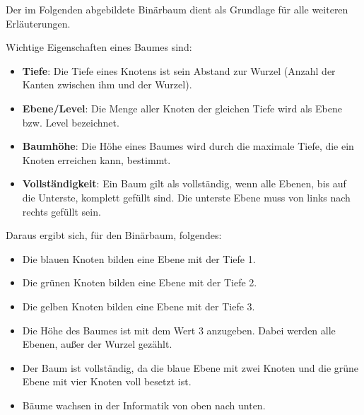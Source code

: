           Der im Folgenden abgebildete Bin\"arbaum dient als Grundlage f\"ur alle weiteren Erl\"auterungen.
          \begin{center}
          \end{center}
          Wichtige Eigenschaften eines Baumes sind:
          \begin{itemize}
            \item \textbf{Tiefe}: Die Tiefe eines Knotens ist sein Abstand zur Wurzel (Anzahl der Kanten zwischen ihm und der Wurzel).
            \item \textbf{Ebene/Level}: Die Menge aller Knoten der gleichen Tiefe wird als Ebene bzw. Level bezeichnet.
            \item \textbf{Baumh\"ohe}: Die H\"ohe eines Baumes wird durch die maximale Tiefe, die ein Knoten erreichen kann, bestimmt.
            \item \textbf{Vollst\"andigkeit}: Ein Baum gilt als vollst\"andig, wenn alle Ebenen, bis auf die Unterste, komplett gef\"ullt sind. Die unterste Ebene muss von links nach rechts gef\"ullt sein.
          \end{itemize}
          Daraus ergibt sich, f\"ur den Bin\"arbaum, folgendes:
          \begin{itemize}
            \item Die blauen Knoten bilden eine Ebene mit der Tiefe 1.
            \item Die gr\"unen Knoten bilden eine Ebene mit der Tiefe 2.
            \item Die gelben Knoten bilden eine Ebene mit der Tiefe 3.
            \item Die H\"ohe des Baumes ist mit dem Wert 3 anzugeben. Dabei werden alle Ebenen, au\ss{}er der Wurzel gez\"ahlt.
            \item Der Baum ist vollst\"andig, da die blaue Ebene mit zwei Knoten und die gr\"une Ebene mit vier Knoten voll besetzt ist.
            \item B\"aume wachsen in der Informatik von oben nach unten.
          \end{itemize}
